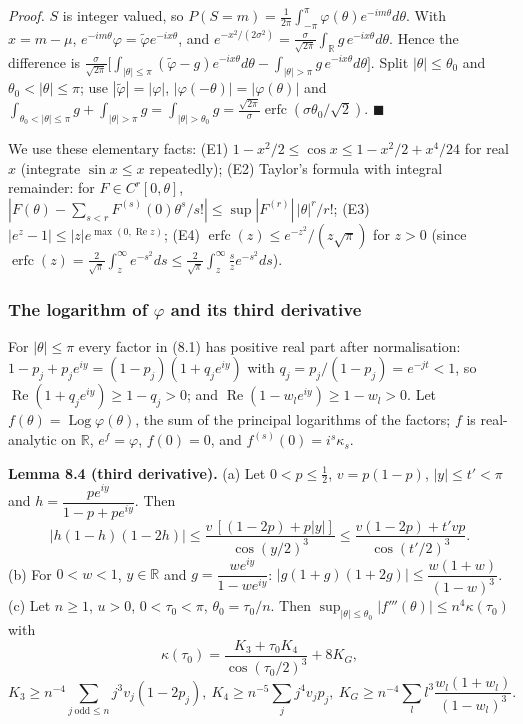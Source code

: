 \emph{Proof.} \(S\) is integer valued, so \(P(S=m)=\frac1{2\pi}\int_{-\pi}^{\pi}\varphi(\theta)e^{-im\theta}d\theta\). With \(x=m-\mu\), \(e^{-im\theta}\varphi=\tilde\varphi e^{-ix\theta}\), and \(e^{-x^2/(2\sigma^2)}=\frac{\sigma}{\sqrt{2\pi}}\int_{\mathbb R}g\,e^{-ix\theta}d\theta\). Hence the difference is \(\frac\sigma{\sqrt{2\pi}}\bigl[\int_{|\theta|\le\pi}(\tilde\varphi-g)e^{-ix\theta}d\theta-\int_{|\theta|>\pi}g\,e^{-ix\theta}d\theta\bigr]\). Split \(|\theta|\le\theta_0\) and \(\theta_0<|\theta|\le\pi\); use \(|\tilde\varphi|=|\varphi|\), \(|\varphi(-\theta)|=|\varphi(\theta)|\) and \(\int_{\theta_0<|\theta|\le\pi}g+\int_{|\theta|>\pi}g=\int_{|\theta|>\theta_0}g=\frac{\sqrt{2\pi}}{\sigma}\operatorname{erfc}(\sigma\theta_0/\sqrt2)\). \(\blacksquare\)

We use these elementary facts: (E1) \(1-x^2/2\le\cos x\le1-x^2/2+x^4/24\) for real \(x\) (integrate \(\sin x\le x\) repeatedly); (E2) Taylor's formula with integral remainder: for \(F\in C^r[0,\theta]\), \(|F(\theta)-\sum_{s<r}F^{(s)}(0)\theta^s/s!|\le\sup|F^{(r)}|\,|\theta|^r/r!\); (E3) \(|e^z-1|\le|z|e^{\max(0,\operatorname{Re}z)}\); (E4) \(\operatorname{erfc}(z)\le e^{-z^2}/(z\sqrt\pi)\) for \(z>0\) (since \(\operatorname{erfc}(z)=\frac2{\sqrt\pi}\int_z^\infty e^{-s^2}ds\le\frac2{\sqrt\pi}\int_z^\infty\frac sze^{-s^2}ds\)).

\subsubsection{\texorpdfstring{The logarithm of \(\varphi\) and its third derivative}{The logarithm of \textbackslash varphi and its third derivative}}\label{the-logarithm-of-varphi-and-its-third-derivative}

For \(|\theta|\le\pi\) every factor in (8.1) has positive real part after normalisation: \(1-p_j+p_je^{iy}=(1-p_j)(1+q_je^{iy})\) with \(q_j=p_j/(1-p_j)=e^{-jt}<1\), so \(\operatorname{Re}(1+q_je^{iy})\ge1-q_j>0\); and \(\operatorname{Re}(1-w_le^{iy})\ge1-w_l>0\). Let \(f(\theta)=\operatorname{Log}\varphi(\theta)\), the sum of the principal logarithms of the factors; \(f\) is real-analytic on \(\mathbb R\), \(e^f=\varphi\), \(f(0)=0\), and \(f^{(s)}(0)=i^s\kappa_s\).

\textbf{Lemma 8.4 (third derivative).} (a) Let \(0<p\le\frac12\), \(v=p(1-p)\), \(|y|\le t'<\pi\) and \(h=\dfrac{pe^{iy}}{1-p+pe^{iy}}\). Then
\[|h(1-h)(1-2h)|\le\frac{v\,[(1-2p)+p|y|]}{\cos(y/2)^3}\le\frac{v(1-2p)+t'vp}{\cos(t'/2)^3}.\]
(b) For \(0<w<1\), \(y\in\mathbb R\) and \(g=\dfrac{we^{iy}}{1-we^{iy}}\): \(|g(1+g)(1+2g)|\le\dfrac{w(1+w)}{(1-w)^3}\).
(c) Let \(n\ge1\), \(u>0\), \(0<\tau_0<\pi\), \(\theta_0=\tau_0/n\). Then \(\sup_{|\theta|\le\theta_0}|f'''(\theta)|\le n^4\kappa(\tau_0)\) with
\[\kappa(\tau_0)=\frac{K_{3}+\tau_0K_{4}}{\cos(\tau_0/2)^3}+8K_{G},\]\[K_3\ge n^{-4}\!\!\sum_{j\ \mathrm{odd}\le n}\!j^3v_j(1-2p_j),\ K_4\ge n^{-5}\!\!\sum_{j}j^4v_jp_j,\ K_G\ge n^{-4}\!\!\sum_{l}l^3\frac{w_l(1+w_l)}{(1-w_l)^3}.\]

